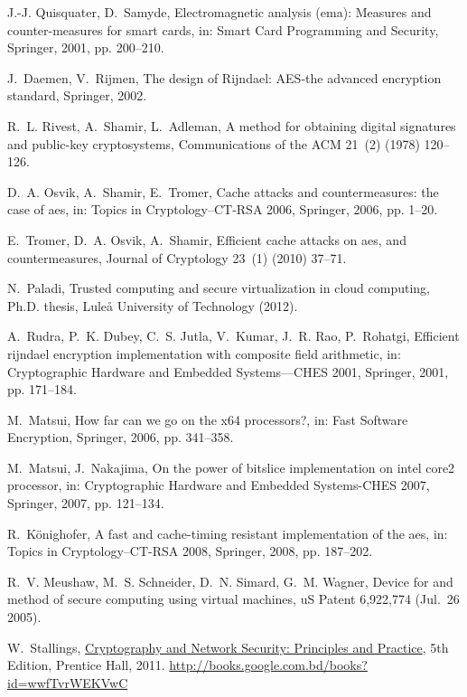 \documentclass[3p]{elsarticle}
\begin{document}
\begin{thebibliography}{10}
J.-J. Quisquater, D.~Samyde, Electromagnetic analysis (ema): Measures and
  counter-measures for smart cards, in: Smart Card Programming and Security,
  Springer, 2001, pp. 200--210.

J.~Daemen, V.~Rijmen, The design of Rijndael: AES-the advanced encryption
  standard, Springer, 2002.

R.~L. Rivest, A.~Shamir, L.~Adleman, A method for obtaining digital signatures
  and public-key cryptosystems, Communications of the ACM 21~(2) (1978)
  120--126.

D.~A. Osvik, A.~Shamir, E.~Tromer, Cache attacks and countermeasures: the case
  of aes, in: Topics in Cryptology--CT-RSA 2006, Springer, 2006, pp. 1--20.

E.~Tromer, D.~A. Osvik, A.~Shamir, Efficient cache attacks on aes, and
  countermeasures, Journal of Cryptology 23~(1) (2010) 37--71.

N.~Paladi, Trusted computing and secure virtualization in cloud computing,
  Ph.D. thesis, Lule{\aa} University of Technology (2012).

A.~Rudra, P.~K. Dubey, C.~S. Jutla, V.~Kumar, J.~R. Rao, P.~Rohatgi, Efficient
  rijndael encryption implementation with composite field arithmetic, in:
  Cryptographic Hardware and Embedded Systems—CHES 2001, Springer, 2001, pp.
  171--184.

M.~Matsui, How far can we go on the x64 processors?, in: Fast Software
  Encryption, Springer, 2006, pp. 341--358.

M.~Matsui, J.~Nakajima, On the power of bitslice implementation on intel core2
  processor, in: Cryptographic Hardware and Embedded Systems-CHES 2007,
  Springer, 2007, pp. 121--134.

R.~K{\"o}nighofer, A fast and cache-timing resistant implementation of the aes,
  in: Topics in Cryptology--CT-RSA 2008, Springer, 2008, pp. 187--202.

R.~V. Meushaw, M.~S. Schneider, D.~N. Simard, G.~M. Wagner, Device for and
  method of secure computing using virtual machines, uS Patent 6,922,774
  (Jul.~26 2005).

W.~Stallings,
  \href{http://books.google.com.bd/books?id=wwfTvrWEKVwC}{Cryptography and
  Network Security: Principles and Practice}, 5th Edition, Prentice Hall, 2011.
\newline\urlprefix\url{http://books.google.com.bd/books?id=wwfTvrWEKVwC}

\end{thebibliography}
\end{document}
